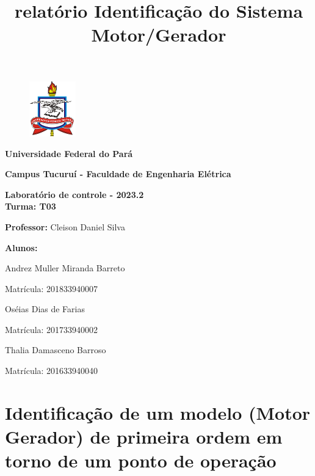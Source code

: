\documentclass[11pt]{article}
\title{relatório Identificação do Sistema Motor/Gerador}
\begin{document}
 
  	\begin{center}
  	\begin{figure}[h!]
  		\centering\includegraphics[width=2cm]{image}
  	\end{figure}
  \end{center}

\begin{minipage}{15cm}
	\centering
	\textbf{Universidade Federal do Pará}
	
	\textbf{Campus Tucuruí - Faculdade de Engenharia Elétrica}
	
	\textbf{Laboratório de controle - 2023.2\\
		Turma: T03}

	\vspace{0.5cm}
\end{minipage}
 
\begin{minipage}{15cm}
	
	\vspace{0.2cm}
	
	
	\textbf{Professor:} Cleison Daniel Silva
	
	\textbf{Alunos:}
	
	\quad \quad \quad \quad  Andrez Muller Miranda Barreto
	
	\quad \quad \quad \quad  Matrícula: 201833940007
	\vspace{0.1cm}
	
	\quad \quad \quad \quad  Oséias Dias de Farias
	
	\quad \quad \quad \quad  Matrícula: 201733940002
	\vspace{0.1cm}
	
	\quad \quad \quad \quad  Thalia Damasceno Barroso
	
	\quad \quad \quad \quad  Matrícula: 201633940040

\end{minipage}
 
 	\vspace{1cm}
  
\hypertarget{identificauxe7uxe3o-de-um-modelo-motor-gerador-de-primeira-ordem-em-torno-de-um-ponto-de-operauxe7uxe3o}{%
\section*{\texorpdfstring{\textbf{Identificação de um modelo (Motor
Gerador) de primeira ordem em torno de um ponto de
operação}}{Identificação de um modelo (Motor Gerador) de primeira ordem em torno de um ponto de operação}}\label{identificauxe7uxe3o-de-um-modelo-motor-gerador-de-primeira-ordem-em-torno-de-um-ponto-de-operauxe7uxe3o}}
\end{document}
